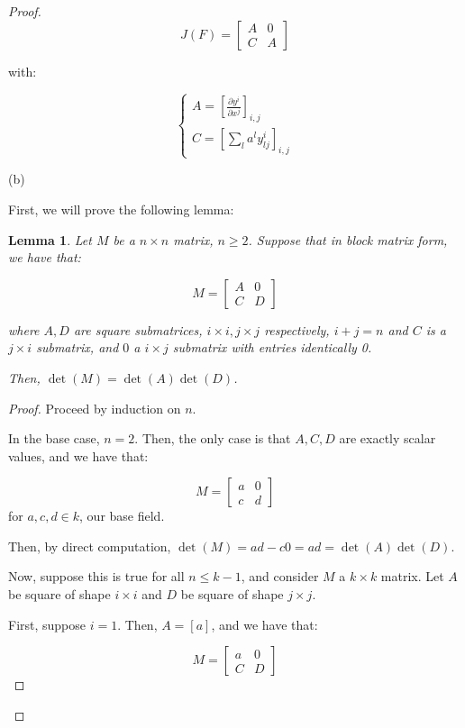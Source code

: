 \documentclass[10pt]{article}
\theoremstyle{nonumberplain}%
\newtheorem*{lemma}{Lemma}
\begin{document}
\begin{proof}
$$ J(F) = \begin{bmatrix} A & 0 \\ C & A \end{bmatrix}$$

with:

$$ \begin{cases} A = \left[\frac{\partial y^i}{\partial x^j}\right]_{i,j} \\ C = \left[ \sum_l a^l y^i_{lj} \right]_{i,j} \end{cases} $$

(b)

First, we will prove the following lemma:

\begin{lemma}
Let $M$ be a $n \times n$ matrix, $n \geq 2$. Suppose that in block matrix form, we have that:

$$M =  \begin{bmatrix} A & 0 \\ C & D \end{bmatrix}$$

where $A, D$ are square submatrices, $i\times i, j \times j$ respectively, $i +j = n$ and $C$ is a $j \times i$ submatrix, and $0$ a $i \times j$ submatrix with entries identically 0.

Then, $\det(M) = \det(A) \det(D)$.

\end{lemma}

\begin{proof}

Proceed by induction on $n$.

In the base case, $n = 2$. Then, the only case is that $A, C, D$ are exactly scalar values, and we have that:

$$M =  \begin{bmatrix} a & 0 \\ c & d \end{bmatrix} $$ for $a, c, d \in k$, our base field.

Then, by direct computation, $\det(M) = ad - c0 = ad = \det(A) \det(D)$.

Now, suppose this is true for all $n \leq k-1$, and consider $M$ a $k\times k$ matrix. Let $A$ be square of shape $i \times i$ and $D$ be square of shape $j \times j$. 

First, suppose $i= 1$. Then, $A = [a]$, and we have that:

$$ M = \begin{bmatrix} a & 0 \\ C & D \end{bmatrix}$$


\end{proof}
\end{proof}
\end{document}
